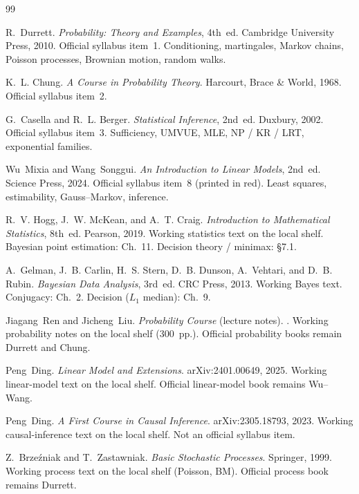 \begin{thebibliography}{99}

R.~Durrett.
\newblock \emph{Probability: Theory and Examples}, 4th~ed.
\newblock Cambridge University Press, 2010.
\newblock Official syllabus item~1. Conditioning, martingales, Markov chains, Poisson processes, Brownian motion, random walks.

K.~L. Chung.
\newblock \emph{A Course in Probability Theory}.
\newblock Harcourt, Brace \& World, 1968.
\newblock Official syllabus item~2.

G.~Casella and R.~L. Berger.
\newblock \emph{Statistical Inference}, 2nd~ed.
\newblock Duxbury, 2002.
\newblock Official syllabus item~3. Sufficiency, UMVUE, MLE, NP / KR / LRT, exponential families.

Wu~Mixia and Wang~Songgui.
\newblock \emph{An Introduction to Linear Models}, 2nd~ed.
\newblock Science Press, 2024.
\newblock Official syllabus item~8 (printed in red). Least squares, estimability, Gauss--Markov, inference.

R.~V. Hogg, J.~W. McKean, and A.~T. Craig.
\newblock \emph{Introduction to Mathematical Statistics}, 8th~ed.
\newblock Pearson, 2019.
\newblock Working statistics text on the local shelf. Bayesian point estimation: Ch.~11. Decision theory / minimax: \S7.1.

A.~Gelman, J.~B. Carlin, H.~S. Stern, D.~B. Dunson, A.~Vehtari, and D.~B. Rubin.
\newblock \emph{Bayesian Data Analysis}, 3rd~ed.
\newblock CRC Press, 2013.
\newblock Working Bayes text. Conjugacy: Ch.~2. Decision (\(L_{1}\) median): Ch.~9.

Jiagang~Ren and Jicheng~Liu.
\newblock \emph{Probability Course} (lecture notes).
.
\newblock Working probability notes on the local shelf (300~pp.). Official probability books remain Durrett and Chung.

Peng~Ding.
\newblock \emph{Linear Model and Extensions}.
\newblock arXiv:2401.00649, 2025.
\newblock Working linear-model text on the local shelf. Official linear-model book remains Wu--Wang.

Peng~Ding.
\newblock \emph{A First Course in Causal Inference}.
\newblock arXiv:2305.18793, 2023.
\newblock Working causal-inference text on the local shelf. Not an official syllabus item.

Z.~Brze{\'z}niak and T.~Zastawniak.
\newblock \emph{Basic Stochastic Processes}.
\newblock Springer, 1999.
\newblock Working process text on the local shelf (Poisson, BM). Official process book remains Durrett.

\end{thebibliography}

